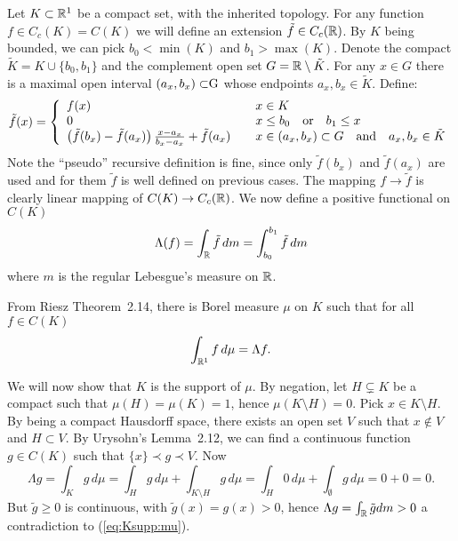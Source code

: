 \begin{enumerate}
Let \(K\subset\mathbb{R}^1\) be a compact set, with the inherited topology.
For any function \(f\in C_c(K) = C(K)\) we will define an extension
\(\tilde{f} \in C_c(\mathbb{R})\). By $K$ being bounded, we can pick
\(b_0 < \min(K)\) and \(b_1 > \max(K)\).
Denote the compact \(\tilde{K} = K \cup \{b_0,b_1\}\)
and the complement open set \(G=\mathbb{R}\setminus \tilde{K}\).
For any \(x\in G\) there is a maximal open interval \((a_x,b_x) \subset $G$\)
whose endpoints \(a_x,b_x\in \tilde{K}\). Define:
\begin{equation*}
 \tilde{f}(x) = \left\{\begin{array}{l@{\qquad}l}
                  f(x) & x \in K \\
                  0    & x \leq b_0 \quad \textrm{or} \quad b_1 \leq x \\
                  \left(\tilde{f}(b_x) - \tilde{f}(a_x)\right)
                  \frac{x - a_x}{b_x - a_x}
                  + \tilde{f}(a_x)
                    & x \in (a_x,b_x)\subset G \quad\textrm{and}\quad
                      a_x,b_x \in \tilde{K}
                  \end{array}\right.
\end{equation*}
Note the ``pseudo'' recursive definition is fine, since
only \(\tilde{f}(b_x)\) and  \(\tilde{f}(a_x)\) are used
and for them \(\tilde{f}\) is well defined on previous cases.
The mapping \(f\to\tilde{f}\) is clearly linear mapping of \(C(K) \to C_c(\mathbb{R})\).
We now define a positive functional on \(C(K)\)
\begin{equation*}
 \Lambda(f) = \int_{\mathbb{R}} \tilde{f}\,dm =  \int_{b_0}^{b_1} \tilde{f}\,dm
\end{equation*}
where $m$ is the regular Lebesgue's measure on \(\mathbb{R}\).

From Riesz Theorem~2.14, there is Borel measure \(\mu\) on $K$
such that for all \(f\in C(K)\)
\begin{equation*}
 \int_{\mathbb{R}^1} f\,d\mu = \Lambda f.
\end{equation*}

We will now show that $K$ is the support of \(\mu\).
By negation, let \(H\subsetneq K\) be a compact such that
 \(\mu(H) = \mu(K)=1\), hence \(\mu(K\setminus H) = 0\).
Pick \(x\in K\setminus H\). By being a compact Hausdorff space,
there exists an open set $V$ such that \(x\notin V\) and \(H\subset V\).
By Urysohn's Lemma~2.12, we can find a continuous function \(g\in C(K)\)
such that \(\{x\} \prec g \prec V\).
Now
\begin{equation} \label{eq:Ksupp:mu}
 \Lambda g = \int_K g\,d\mu = \int_H g\,d\mu + \int_{K\setminus H} g\,d\mu
           = \int_H 0\,d\mu + \int_{\emptyset} g\,d\mu = 0+0 = 0.
\end{equation}
But \(\tilde{g} \geq 0\) is continuous, with \(\tilde{g}(x) = g(x) > 0\),
hence
\(\Lambda g = \int_{\mathbb{R}} \tilde{g}dm > 0\) a contradiction
to (\ref{eq:Ksupp:mu}).



\end{enumerate}

